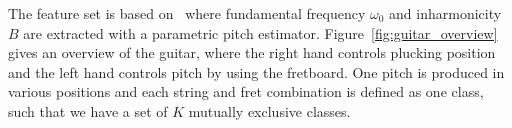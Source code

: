 \documentclass{article}
\begin{document}
\begin{sloppy}
% 
The feature set is based on~\cite{hjerrild::icassp19} where fundamental frequency $\omega_0$ and inharmonicity $B$ are extracted with a parametric pitch estimator.  Figure~\ref{fig:guitar_overview} gives an overview of the guitar, where the right hand controls plucking position and the left hand controls pitch by using the fretboard. One pitch is produced in various positions and each string and fret combination is defined as one class, such that we have a set of $K$ mutually exclusive classes. 
%
%
%
% 

\end{sloppy}
\end{document}
